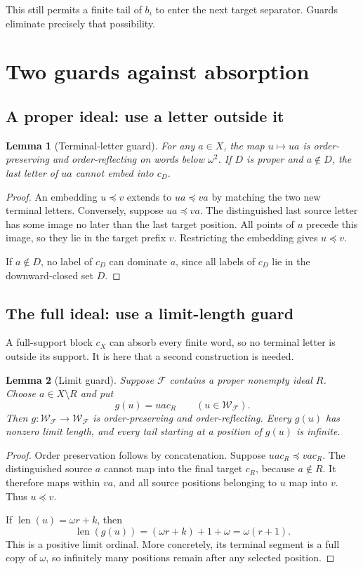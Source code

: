 \documentclass[11pt]{article}
\numberwithin{equation}{section}
\theoremstyle{plain}
\newtheorem{lemma}[lemma]{Lemma}
\theoremstyle{definition}
\theoremstyle{remark}
\newcommand{\F}{\mathcal F}
\newcommand{\W}{\mathcal W}
\newcommand{\len}{\operatorname{len}}
\newcommand{\sub}{\preccurlyeq}
\begin{document}
This still permits a finite tail of $b_i$ to enter the next target separator. Guards eliminate precisely that possibility.

\section{Two guards against absorption}\label{sec:guards}

\subsection{A proper ideal: use a letter outside it}

\begin{lemma}[Terminal-letter guard]\label{lem:letterguard}
For any $a\in X$, the map $u\mapsto ua$ is order-preserving and order-reflecting on words below $\omega^2$. If $D$ is proper and $a\notin D$, the last letter of $ua$ cannot embed into $c_D$.
\end{lemma}
\begin{proof}
An embedding $u\sub v$ extends to $ua\sub va$ by matching the two new terminal letters. Conversely, suppose $ua\sub va$. The distinguished last source letter has some image no later than the last target position. All points of $u$ precede this image, so they lie in the target prefix $v$. Restricting the embedding gives $u\sub v$.

If $a\notin D$, no label of $c_D$ can dominate $a$, since all labels of $c_D$ lie in the downward-closed set $D$.
\end{proof}

\subsection{The full ideal: use a limit-length guard}

A full-support block $c_X$ can absorb every finite word, so no terminal letter is outside its support. It is here that a second construction is needed.

\begin{lemma}[Limit guard]\label{lem:limitguard}
Suppose $\F$ contains a proper nonempty ideal $R$. Choose $a\in X\setminus R$ and put
\begin{equation}\label{eq:limitguard}
 g(u)=u a c_R\qquad(u\in\W_{\F}).
\end{equation}
Then $g:\W_{\F}\to\W_{\F}$ is order-preserving and order-reflecting. Every $g(u)$ has nonzero limit length, and every tail starting at a position of $g(u)$ is infinite.
\end{lemma}
\begin{proof}
Order preservation follows by concatenation. Suppose $uac_R\sub vac_R$. The distinguished source $a$ cannot map into the final target $c_R$, because $a\notin R$. It therefore maps within $va$, and all source positions belonging to $u$ map into $v$. Thus $u\sub v$.

If $\len(u)=\omega r+k$, then
\[
 \len(g(u))=(\omega r+k)+1+\omega=\omega(r+1).
\]
This is a positive limit ordinal. More concretely, its terminal segment is a full copy of $\omega$, so infinitely many positions remain after any selected position.
\end{proof}
\end{document}
